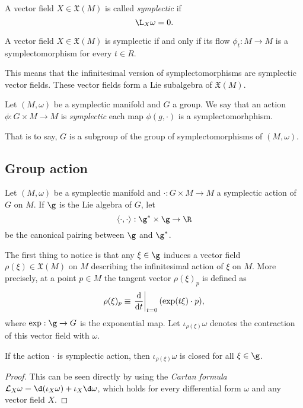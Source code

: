 \documentclass{worksheetclass}
\begin{document}
        \begin{defn}
            A vector field $X\in\mathfrak{X}(M)$ is called \emph{symplectic} if
            \begin{equation*}
                \L_X\omega = 0.
            \end{equation*}
        \end{defn}
        \begin{prop}
            A vector field $X\in\mathfrak{X}(M)$ is symplectic if and only if its flow $\phi_t:M\to M$ is a symplectomorphism for every $t\in R$.
        \end{prop}
        This means that the infinitesimal version of symplectomorphisms are symplectic vector fields. These vector fields form a Lie subalgebra of $\mathfrak{X}(M)$.

        \begin{defn}
            Let $(M,\omega)$ be a symplectic manifold and $G$ a group. We say that an action $\phi:G\times M\to M$ is \emph{symplectic} each map $\phi(g,\cdot)$ is a symplectomorhphism.
        \end{defn}
        That is to say, $G$ is a subgroup of the group of symplectomorphisms of $(M,\omega)$.

    \subsection{Group action}

        Let $(M,\omega)$ be a symplectic manifold and $\cdot:G\times M\to M$ a symplectic action of $G$ on $M$. If $\g$ is the Lie algebra of $G$, let
        \begin{equation}
            \langle\cdot,\cdot\rangle : \g^*\times\g\to\R
        \end{equation}
        be the canonical pairing between $\g$ and $\g^*$. 
        
        The first thing to notice is that any $\xi\in\g$ induces a vector field $\rho(\xi)\in\mathfrak{X}(M)$ on $M$ describing the infinitesimal action of $\xi$ on $M$. More precisely, at a point $p\in M$ the tangent vector $\rho(\xi)_p$ is defined as
        \begin{equation}
            \rho(\xi)_p\equiv\eval{\dv{}{t}}_{t=0}(\exp(t\xi)\cdot p),\label{eq:rhodef}
        \end{equation}
        where $\exp:\g\to G$ is the exponential map. Let $\iota_{\rho(\xi)}\omega$ denotes the contraction of this vector field with $\omega$.
        \begin{prop}
            If the action $\cdot$ is symplectic action, then $\iota_{\rho(\xi)}\omega$ is closed for all $\xi\in\g$.
        \end{prop}
        \begin{proof}
            This can be seen directly by using the \emph{Cartan formula} $\mathcal{L}_X\omega=\d(\iota_X\omega)+\iota_X\d\omega$, which holds for every differential form $\omega$ and any vector field $X$.
        \end{proof}
\end{document}

